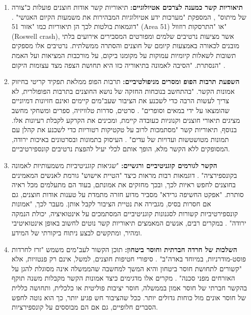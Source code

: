 \documentclass[12pt,a4paper]{article}
\begin{document}
\begin{enumerate}
    \item \textbf{תיאוריות קשר כמענה לצרכים אטיולוגיים:} תיאוריות קשר אודות חוצנים פועלות כ"צורה של מיתוס" \cite[p. 3]{s41599-025-04799-8}, המספקת "מערכות ידע אטיולוגיות המבהירות את משמעות הקיום האנושי" \cite[p. 3]{s41599-025-04799-8}. דוגמאות בולטות לכך הן תיאוריות כמו "אזור 51" (Area 51) או "התרסקות רוזוול" (Roswell crash), אשר מציעות נרטיבים שלמים ומפורטים המסבירים אירועים בלתי מובנים לכאורה באמצעות קיומם של חוצנים והסתרה ממשלתית. נרטיבים אלו מספקים תשובות לשאלות קיומיות עמוקות על מקומנו ביקום, על מורכבות המציאות ועל האמת הנסתרת. "הסיבה לאמונה בתיאוריה כזו היא תחושת הצפה מצד עצומות היקום" \cite[p. 3]{s41599-025-04799-8}.
    \item \textbf{השפעת תרבות הפופ ומסרים מניפולטיביים:} תרבות הפופ ממלאת תפקיד קריטי בחיזוק אמונות הקשר. "בהתחשב בנוכחות החזקה של נושא החוצנים בתרבות הפופולרית, לא צריך לעשות הרבה כדי לשכנע את הציבור שעב"מים קיימים ואינם חזיונות דמיוניים שהומצאו על ידי במאים וסופרים" \cite[p. 3]{s41599-025-04799-8}. סרטים, סדרות טלוויזיה, ספרים ומשחקי מחשב מציגים תיאורי חוצנים וקנוניות כעובדה קיימת, ומכינים את הקרקע לקבלת רעיונות אלו. בנוסף, תיאוריות קשר "מסתמכות לרוב על טקטיקות רטוריות כדי לשכנע את קהלן עם תמונות מטושטשות ועדויות של עדים" \cite[p. 3]{s41599-025-04799-8}. העיסוק בתמונות ובסרטונים באיכות ירודה, המסופקים ללא הקשר מלא, הופך אותם לכלי יעיל להפצת נרטיבים קונספירטיביים.
    \item \textbf{הקשר לגורמים קוגניטיביים ורגשיים:} "שגיאות קוגניטיביות משמעותיות לאמונה בקונספירציה" \cite[p. 3]{s41599-025-04799-8}. דוגמאות רבות מראות כיצד "הטיית אישוש" גורמת לאנשים המאמינים בחוצנים לחפש ראיות לכך, ובכך מחזקים את אמונתם, בעוד הם מתעלמים מכל ראיה סותרת. "אפקט החשיפה גרידא" מסביר מדוע חזרה מתמדת על טענות אודות חוצנים, גם אם חסרות בסיס, מגבירה את נטיית הציבור לקבל אותן. מעבר לכך, "אמונות קונספירטיביות קשורות לסגנונות קוגניטיביים המסתמכים על אינטואיציה, יכולת הנמקה ירודה" \cite[p. 4]{s41599-025-04799-8}. במקרים רבים, אנשים המאמצים תיאוריות קשר נוטים לחשוב באופן אינטואיטיבי ומהיר, ומתקשים לבצע ניתוח ביקורתי של המידע.
    \item \textbf{השלכות של חרדה חברתית וחוסר ביטחון:} תוכן הקשור לעב"מים משמש "זרז לחרדות פוסט-מודרניות, במיוחד בארה"ב" \cite[p. 4]{s41599-025-04799-8}. סיפורי חטיפות חוצנים, למשל, אינם רק פנטזיות, אלא "קשורים לתחושת חוסר ביטחון והיא המשך למחשבה שהממשלה אינה מסוגלת להגן על האזרחים מפני סכנה" \cite[p. 4]{s41599-025-04799-8}. מקרים אלו מדגימים כיצד אמונות הקשר מקבלות משנה תוקף בהקשר חברתי של חוסר אמון בממשלה, חוסר יציבות פוליטית או כלכלית, ותחושה כללית של חוסר אונים מול כוחות גדולים יותר. ככל שהציבור חש פגיע יותר, כך הוא נוטה לחפש הסברים חלופיים, גם אם הם מבוססים על קונספירציות.
\end{enumerate}
\end{document}
